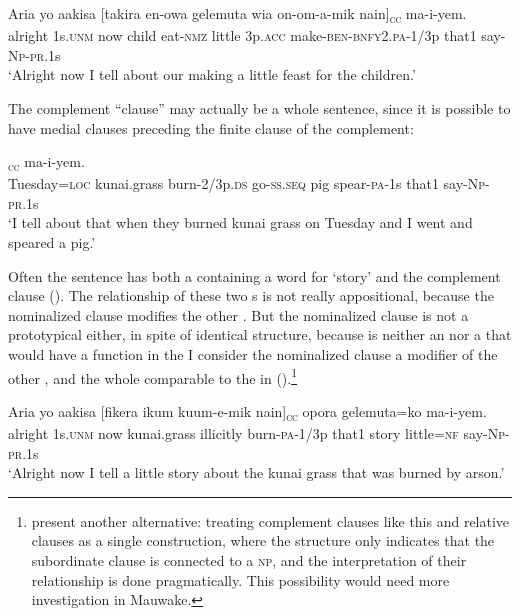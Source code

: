 \ea%
\label{ex:x1596}
\gll Aria  yo  aakisa  [takira  en-owa  gelemuta  wia on-om-a-mik  nain]\textsubscript{\textsc{cc}} ma-i-yem.\\
alright  1s.\textsc{unm} now  child eat-\textsc{nmz} little 3p.\textsc{acc} make-\textsc{ben}-\textsc{bnfy}2.\textsc{pa}-1/3p  that1 say-\textsc{Np}-\textsc{pr}.1s\\
\glt`Alright now I tell about our making a little feast for the children.'
\z


The complement ``clause'' may actually be a whole sentence, since it is possible to have medial clauses preceding the finite clause of the complement:

\ea%
\label{ex:x1597}
\gll [Tunde=pa  fikera  kuum-iwkin  ikiw-ep  waaya mik-a-m  nain]\textsubscript{\textsc{cc}} ma-i-yem.\\
Tuesday=\textsc{loc} kunai.grass burn-2/3p.\textsc{ds} go-\textsc{ss}.\textsc{seq} pig spear-\textsc{pa}-1s that1 say-\textsc{Np}-\textsc{pr}.1s\\
\glt`I tell about that when they burned kunai grass on Tuesday and I went and speared a pig.'
\z


Often the sentence has both a  containing a word for `story' and the complement clause (). The relationship of these two s is not really appositional, because the nominalized clause modifies the other . But the nominalized clause is not a prototypical  either, in spite of identical structure, because  is neither an  nor a  that would have a function in the  I consider the nominalized clause a modifier of the other , and the whole comparable to the  in ().\footnote{\citet{ComrieEtAl1995} present another alternative: treating complement clauses like this and relative clauses as a single construction, where the structure only indicates that the subordinate clause is connected to a \textsc{np}, and the interpretation of their relationship is done pragmatically. This possibility would need more investigation in Mauwake.} 

\ea%
\label{ex:x1594}
\gll Aria  yo  aakisa  [fikera  ikum  kuum-e-mik  nain]\textsubscript{\textsc{cc}} opora  gelemuta=ko  ma-i-yem.\\
alright  1s.\textsc{unm} now  kunai.grass  illicitly  burn-\textsc{pa}-1/3p  that1 story  little=\textsc{nf} say-\textsc{Np}-\textsc{pr}.1s\\
\glt`Alright now I tell a little story about the kunai grass that was burned by arson.'
\z


